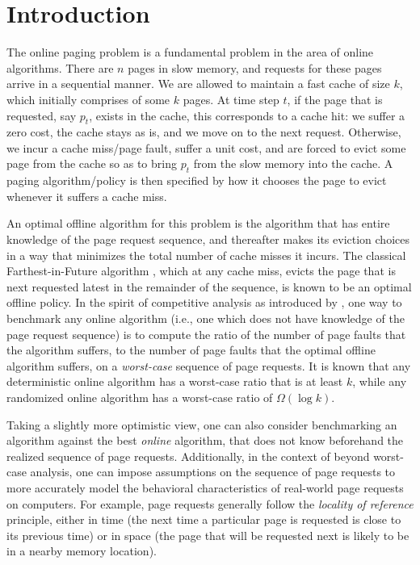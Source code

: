 \section{Introduction}
\label{sec:intro}


The online paging problem is a fundamental problem in %
the area of online
algorithms. There are $n$ pages in slow memory, and requests for these pages arrive in a sequential manner. We are allowed to maintain a fast cache of size $k$, which initially comprises of some $k$ pages. At time step $t$, if the page that is requested, say $p_t$, exists in the cache, this corresponds to a cache hit: we suffer a zero cost, the cache stays as is, and we move on to the next request. Otherwise, we incur a cache miss/page fault, suffer a unit cost, and are forced to evict some page from the cache so as to bring $p_t$ from the slow memory into the cache. A paging algorithm/policy is then specified by how it chooses the page to evict whenever it suffers a cache miss.

An optimal offline algorithm for this problem is the algorithm that has entire knowledge of the page request sequence, and thereafter makes its eviction choices in a way that minimizes the total number of cache misses it incurs. The classical Farthest-in-Future algorithm \citep{belady1966study}, which at any cache miss, evicts the page that is next requested latest in the remainder of the sequence, is known to be an optimal offline policy. In the spirit of competitive analysis as introduced by \cite{sleator1985amortized}, one way to benchmark any online algorithm (i.e., one which does not have knowledge of the page request sequence) is to compute the ratio of the number of page faults that the algorithm suffers, to the number of page faults that the optimal offline algorithm suffers, on a \textit{worst-case} sequence of page requests. It is known that any deterministic online algorithm has a worst-case ratio that is at least $k$, while any randomized online algorithm has a worst-case ratio of $\Omega(\log k)$.

Taking a slightly more optimistic view, one can also consider benchmarking an algorithm against the best \textit{online} algorithm, that does not know beforehand the realized sequence of page requests. Additionally, in the context of beyond worst-case analysis, one can impose assumptions on the sequence of page requests to more accurately model the behavioral characteristics of real-world page requests on computers. For example, page requests generally follow the \textit{locality of reference} principle, either in time (the next time a particular page is requested is close to its previous time) or in space (the page that will be requested next is likely to be in a nearby memory location).%

